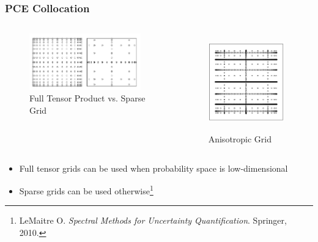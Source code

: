 \documentclass[9pt]{beamer}
\begin{document}
\begin{frame}
\frametitle{PCE Collocation}
\label{sec-2-5}

\begin{columns}[c]
    \centering
    \begin{figure}
    \includegraphics[width=0.95\textwidth]{SparseGrid1}
    \caption{Full Tensor Product vs. Sparse Grid}
    \end{figure}
    \centering
    \begin{figure}
    \includegraphics[width=0.95\textwidth]{SparseGrid2} \\
    \caption{Anisotropic Grid}
    \end{figure}
\end{columns}

\begin{itemize}
\item Full tensor grids can be used when probability space is low-dimensional
\item Sparse grids can be used otherwise\footnote{LeMaitre O. \emph{Spectral Methods for Uncertainty Quantification}. Springer, 2010.
 }
\end{itemize}
\end{frame}
\end{document}
